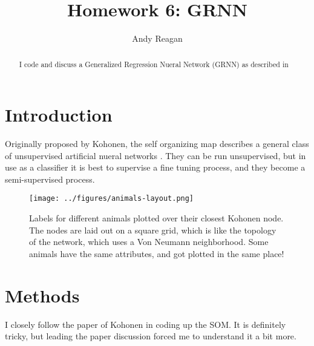 \documentclass[pre,twocolumn,twoside,byrevtex,superscriptaddress]{revtex4}
\begin{document}




\title{\vspace{-2cm}Homework 6: GRNN}
\author{Andy Reagan}

\begin{abstract}
I code and discuss a Generalized Regression Nueral Network (GRNN) as described in 
\end{abstract}

\maketitle

\section{Introduction}

Originally proposed by Kohonen, the self organizing map describes a general class of unsupervised artificial nueral networks \cite{kohonen1990self}.
They can be run unsupervised, but in use as a classifier it is best to supervise a fine tuning process, and they become a semi-supervised process.

\begin{figure}
 \centering
  \texttt{[image: ../figures/animals-layout.png]}
  \label{fig:1}
  \caption{Labels for different animals plotted over their closest Kohonen node.
The nodes are laid out on a square grid, which is like the topology of the network, which uses a Von Neumann neighborhood.
Some animals have the same attributes, and got plotted in the same place!}
\end{figure}



\section{Methods}

I closely follow the paper of Kohonen in coding up the SOM.
It is definitely tricky, but leading the paper discussion forced me to understand it a bit more.
\end{document}
